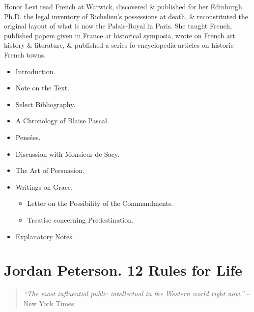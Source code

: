 \documentclass{article}
\begin{document}
\begin{enumerate}
	{\sc Honor Levi} read French at Warwick, discovered \& published for her Edinburgh Ph.D. the legal inventory of Richelieu's possessions at death, \& reconstituted the original layout of what is now the Palais-Royal in Paris. She taught French, published papers given in France at historical symposia, wrote on French art history \& literature, \& published a series fo encyclopedia articles on historic French towns.
	\begin{itemize}
		\item {\sf Introduction.}
		\item {\sf Note on the Text.}
		\item {\sf Select Bibliography.}
		\item {\sf A Chronology of {\sc Blaise Pascal}.}
		\item {\sf Pens\'ees.}
		\item {\sf Discussion with Monsieur de Sacy.}
		\item {\sf The Art of Persuasion.}
		\item {\sf Writings on Grace.}
		\begin{itemize}
			\item {\sf Letter on the Possibility of the Commandments.}
			\item {\sf Treatise concerning Predestination.}
		\end{itemize}
		\item {\sf Explanatory Notes.}
	\end{itemize}
\end{enumerate}


\section{Jordan Peterson. 12 Rules for Life}

\begin{quotation}
	\textit{``The most influential public intellectual in the Western world right now.''} -- New York Times
\end{quotation}
\end{document}
